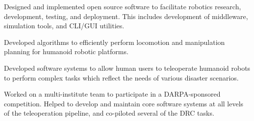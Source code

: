 \documentclass[10pt,a4paper,ragged2e]{altacv}
\begin{document}
Designed and implemented open source software to facilitate robotics research, development, testing, and deployment. This includes development of middleware, simulation tools, and CLI/GUI utilities.

\divider

Developed algorithms to efficiently perform locomotion and manipulation planning for humanoid robotic platforms.

\divider

Developed software systems to allow human users to teleoperate humanoid robots to perform complex tasks which reflect the needs of various disaster scenarios.

\divider

Worked on a multi-institute team to participate in a DARPA-sponsored competition. Helped to develop and maintain core software systems at all levels of the teleoperation pipeline, and co-piloted several of the DRC tasks.

\clearpage


\nocite{*}


\printbibliography[heading=pubtype,title={\printinfo{\faGraduationCap}{Doctoral Thesis}},type=thesis]

\divider

\printbibliography[heading=pubtype,title={\printinfo{\faFileTextO}{Journal Article}},type=article]

\divider

\printbibliography[heading=pubtype,title={\printinfo{\faGroup}{Conference Proceedings}},type=inproceedings]


\end{document}

